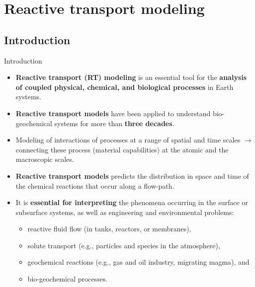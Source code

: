\section{Reactive transport modeling}
%
%
\subsection{Introduction}
\begin{frame}{Introduction}
	\vskip 10pt
	\begin{itemize}
		\item \alert{\bf Reactive transport (RT) modeling} is an essential tool for the {\bf analysis of coupled physical, chemical, and biological processes} in Earth systems.
		\pause
		\item \alert{\bf Reactive transport models} have been applied to understand bio-geochemical systems for more than {\bf three decades}.
		\pause
		\item Modeling of interactions of processes at a range of spatial and time scales $\rightarrow$ connecting these process (material capabilities) at the atomic and the macroscopic scales.
		\pause
		\item  \alert{\bf Reactive transport models} predicts the distribution in space and time of the chemical reactions that occur along a flow-path.
		\pause
		\item It is {\bf essential for interpreting}
		the phenomena occurring in the surface or subsurface systems, as well as engineering and environmental problems:
		\begin{itemize}
			\item reactive fluid flow (in tanks, reactors, or membranes),
			\item solute transport (e.g., particles and species in the atmosphere),
			\item geochemical reactions (e.g., gas and oil industry, migrating magma), and 
			\item bio-geochemical processes. 
		\end{itemize}
	\end{itemize}
\end{frame}
%
